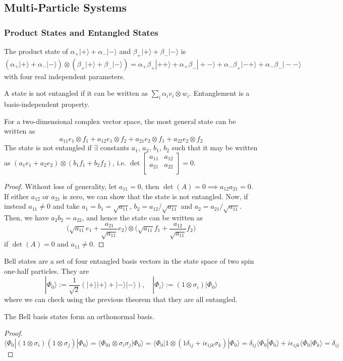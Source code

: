 \documentclass[a4paper]{article}
\begin{document}
\subsection{Multi-Particle Systems}
\subsubsection*{Product States and Entangled States}
\begin{defi}
The product state of $\alpha_+|+\rangle+\alpha_-|-\rangle$ and $\beta_+|+\rangle+\beta_-|-\rangle$ is
$$(\alpha_+|+\rangle+\alpha_-|-\rangle)\otimes(\beta_+|+\rangle+\beta_-|-\rangle)=\alpha_+\beta_+|++\rangle+\alpha_+\beta_-|+-\rangle+\alpha_-\beta_+|-+\rangle+\alpha_-\beta_-|--\rangle$$
with four real independent parameters.
\end{defi}
\begin{defi}
A state is not entangled if it can be written as $\sum_i\alpha_iv_i\otimes w_i$. Entanglement is a basis-independent property. 
\end{defi}
\begin{thm}
For a two-dimensional complex vector space, the most general state can be written as
$$a_{11}e_1\otimes f_1+a_{12}e_1\otimes f_2+a_{21}e_2\otimes f_1+a_{22}e_2\otimes f_2$$
The state is not entangled if $\exists$ constants $a_1$, $a_2$, $b_1$, $b_2$ such that it may be written as $(a_1e_1+a_2e_2)\otimes(b_1f_1+b_2f_2)$, i.e. $\det\begin{bmatrix}a_{11}&a_{12}\\a_{21}&a_{22}\\\end{bmatrix}=0$. 
\end{thm}
\begin{proof}
Without loss of generality, let $a_{11}=0$, then $\det(A)=0\implies a_{12}a_{21}=0$. If either $a_{12}$ or $a_{21}$ is zero, we can show that the state is not entangled. Now, if instead $a_{11}\neq0$ and take $a_1=b_1=\sqrt{a_{11}}$, $b_2=a_{12}/\sqrt{a_{11}}$ and $a_2=a_{21}/\sqrt{a_{11}}$. Then, we have $a_2b_2=a_{22}$, and hence the state can be written as
$$\bigg(\sqrt{a_{11}}e_1+\frac{a_{21}}{\sqrt{a_{11}}}e_2\bigg)\otimes\bigg(\sqrt{a_{11}}f_1+\frac{a_{12}}{\sqrt{a_{11}}}f_2\bigg)$$
if $\det(A)=0$ and $a_{11}\neq 0$.
\end{proof}
\begin{defi}
Bell states are a set of four entangled basis vectors in the state space of two spin one-half particles. They are
$$|\Phi_0\rangle:=\frac{1}{\sqrt{2}}(|+\rangle|+\rangle+|-\rangle|-\rangle),\quad|\Phi_i\rangle:=(1\otimes\sigma_i)|\Phi_0\rangle$$
where we can check using the previous theorem that they are all entangled.
\end{defi}
\begin{thm}
The Bell basis states form an orthonormal basis.
\end{thm}
\begin{proof}
$$\langle\Phi_0|(1\otimes\sigma_i)(1\otimes\sigma_j)|\Phi_0\rangle=\langle\Phi_01\otimes\sigma_i\sigma_j|\Phi_0\rangle=\langle\Phi_0|1\otimes(1\delta_{ij}+i\epsilon_{ijk}\sigma_k)|\Phi_0\rangle=\delta_{ij}\langle\Phi_0|\Phi_0\rangle+i\epsilon_{ijk}\langle\Phi_0|\Phi_k\rangle=\delta_{ij}$$
\end{proof}
\newpage
\end{document}
